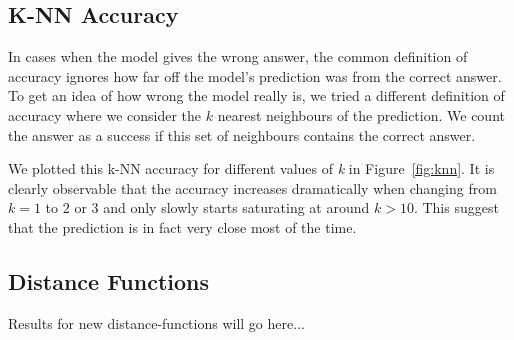 \documentclass[conference]{IEEEtran}
\begin{document}
\subsection{K-NN Accuracy}
In cases when the model gives the wrong answer, the common definition of accuracy ignores how far off the model's prediction was from the correct answer. To get an idea of how wrong the model really is, we tried a different definition of accuracy where we consider the $k$ nearest neighbours of the prediction. We count the answer as a success if this set of neighbours contains the correct answer.

We plotted this k-NN accuracy for different values of \textit{k} in Figure~\ref{fig:knn}. It is clearly observable that the accuracy increases dramatically when changing from $k=1$ to $2$ or $3$ and only slowly starts saturating at around $k>10$. This suggest that the prediction is in fact very close most of the time.


\subsection{Distance Functions}
Results for new distance-functions will go here...
\end{document}
